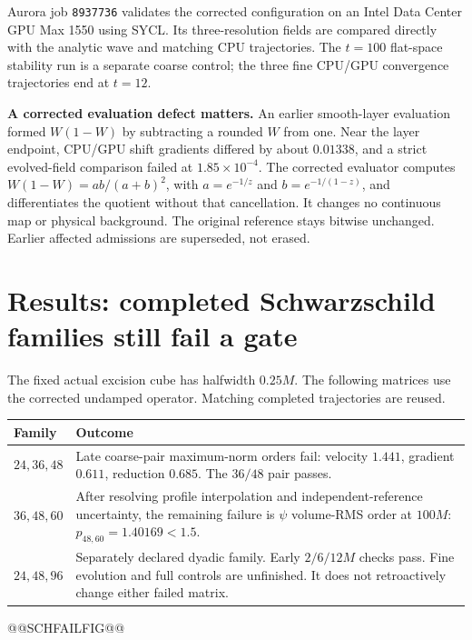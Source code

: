 \documentclass[11pt,letterpaper]{article}
\begin{document}
Aurora job \texttt{8937736} validates the corrected configuration on an Intel Data Center GPU Max 1550 using SYCL. Its three-resolution fields are compared directly with the analytic wave and matching CPU trajectories. The $t=100$ flat-space stability run is a separate coarse control; the three fine CPU/GPU convergence trajectories end at $t=12$.

\textbf{A corrected evaluation defect matters.} An earlier smooth-layer evaluation formed $W(1-W)$ by subtracting a rounded $W$ from one. Near the layer endpoint, CPU/GPU shift gradients differed by about $0.01338$, and a strict evolved-field comparison failed at $1.85\times10^{-4}$. The corrected evaluator computes $W(1-W)=ab/(a+b)^2$, with $a=e^{-1/z}$ and $b=e^{-1/(1-z)}$, and differentiates the quotient without that cancellation. It changes no continuous map or physical background. The original reference stays bitwise unchanged. Earlier affected admissions are superseded, not erased.

\clearpage
\section{Results: completed Schwarzschild families still fail a gate}
The fixed actual excision cube has halfwidth $0.25M$. The following matrices use the corrected undamped operator. Matching completed trajectories are reused.
\begin{center}\small
\begin{tabularx}{\linewidth}{@{}p{2.5cm}X@{}}\toprule
Family & Outcome \\\midrule
$24,36,48$ & Late coarse-pair maximum-norm orders fail: velocity $1.441$, gradient $0.611$, reduction $0.685$. The $36/48$ pair passes. \\
$36,48,60$ & After resolving profile interpolation and independent-reference uncertainty, the remaining failure is $\psi$ volume-RMS order at $100M$: $p_{48,60}=1.40169<1.5$. \\
$24,48,96$ & Separately declared dyadic family. Early $2/6/12M$ checks pass. Fine evolution and full controls are unfinished. It does not retroactively change either failed matrix. \\\bottomrule
\end{tabularx}\end{center}
@@SCHFAILFIG@@
\end{document}
